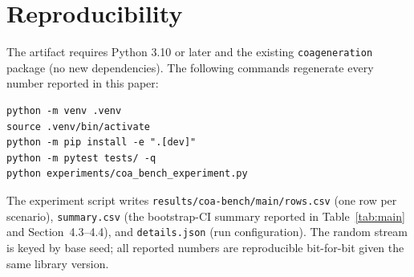 \documentclass[sigconf]{acmart}
\begin{document}



\appendix

\section{Reproducibility}

The artifact requires Python 3.10 or later and the existing \texttt{coageneration} package (no new dependencies). The following commands regenerate every number reported in this paper:

\begin{verbatim}
python -m venv .venv
source .venv/bin/activate
python -m pip install -e ".[dev]"
python -m pytest tests/ -q
python experiments/coa_bench_experiment.py
\end{verbatim}

The experiment script writes \texttt{results/coa-bench/main/rows.csv} (one row per scenario), \texttt{summary.csv} (the bootstrap-CI summary reported in Table~\ref{tab:main} and Section~4.3--4.4), and \texttt{details.json} (run configuration). The random stream is keyed by base seed; all reported numbers are reproducible bit-for-bit given the same library version.
\end{document}
